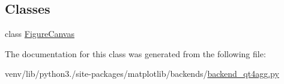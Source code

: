 \subsection*{Classes}
\begin{DoxyCompactItemize}
\item 
class \hyperlink{classmatplotlib_1_1backends_1_1backend__qt4agg_1_1__BackendQT4Agg_1_1FigureCanvas}{Figure\+Canvas}
\end{DoxyCompactItemize}


The documentation for this class was generated from the following file\+:\begin{DoxyCompactItemize}
\item 
venv/lib/python3./site-\/packages/matplotlib/backends/\hyperlink{backend__qt4agg_8py}{backend\+\_\+qt4agg.\+py}\end{DoxyCompactItemize}
